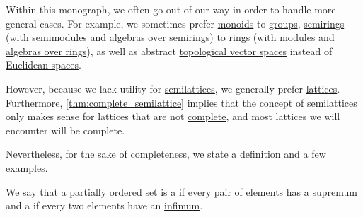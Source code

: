 \begin{remark}\label{rem:semilattices}
  Within this monograph, we often go out of our way in order to handle more general cases. For example, we sometimes prefer \hyperref[def:monoid]{monoids} to \hyperref[def:group]{groups}, \hyperref[def:semiring]{semirings} (with \hyperref[def:semimodule]{semimodules} and \hyperref[def:algebra_over_semiring]{algebras over semirings}) to \hyperref[def:ring]{rings} (with \hyperref[def:module]{modules} and \hyperref[def:algebra_over_ring]{algebras over rings}), as well as abstract \hyperref[def:topological_vector_space]{topological vector spaces} instead of \hyperref[def:euclidean_space]{Euclidean spaces}.

  However, because we lack utility for \hyperref[def:semilattice]{semilattices}, we generally prefer \hyperref[def:lattice]{lattices}. Furthermore, \cref{thm:complete_semilattice} implies that the concept of semilattices only makes sense for lattices that are not \hyperref[def:complete_lattice]{complete}, and most lattices we will encounter will be complete.

  Nevertheless, for the sake of completeness, we state a definition and a few examples.
\end{remark}

\begin{definition}\label{def:semilattice}
  We say that a \hyperref[def:partially_ordered_set]{partially ordered set} is a  if every pair of elements has a \hyperref[def:extremal_points/supremum_and_infimum]{supremum} and a  if every two elements have an \hyperref[def:extremal_points/supremum_and_infimum]{infimum}.
\end{definition}

